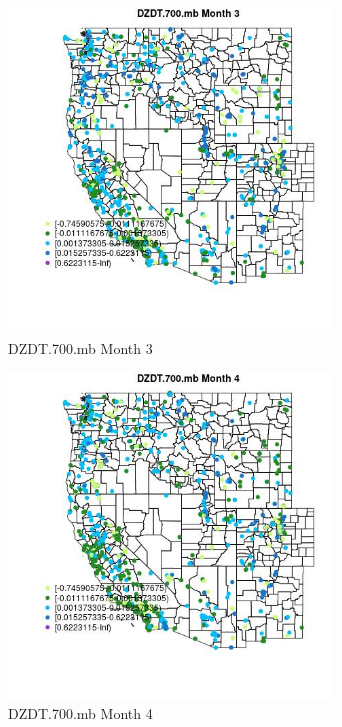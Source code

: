 \begin{figure} 
\centering  
\includegraphics[width=0.77\textwidth]{Code_Outputs/Report_ML_input_PM25_Step4_part_f_de_duplicated_aveswNAs_MapObsMo3DZDT700mb.jpg} 
\caption{\label{fig:Report_ML_input_PM25_Step4_part_f_de_duplicated_aveswNAsMapObsMo3DZDT700mb}DZDT.700.mb Month 3} 
\end{figure} 
 

\begin{figure} 
\centering  
\includegraphics[width=0.77\textwidth]{Code_Outputs/Report_ML_input_PM25_Step4_part_f_de_duplicated_aveswNAs_MapObsMo4DZDT700mb.jpg} 
\caption{\label{fig:Report_ML_input_PM25_Step4_part_f_de_duplicated_aveswNAsMapObsMo4DZDT700mb}DZDT.700.mb Month 4} 
\end{figure} 
 

